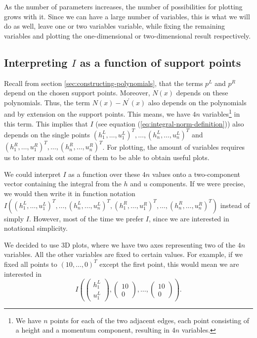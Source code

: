 \documentclass[a4paper, twoside]{article}
\begin{document}
As the number of parameters increases, the number of possibilities for plotting grows with it.
Since we can have a large number of variables, this is what we will do as well, leave one or two variables variable, while fixing the remaining variables and plotting the one-dimensional or two-dimensional result respectively.

\subsection{\texorpdfstring{Interpreting $I$ as a function of support points}{Interpreting I as a function of support points}}
\label{sec:some-considerations}

Recall from section \ref{sec:constructing-polynomials}, that the terms $p^L$ and $p^R$ depend on the chosen support points. Moreover, $N\left(x\right)$ depends on these polynomials. Thus, the term $N\left(x\right)-N^\prime\left(x\right)$ also depends on the polynomials and by extension on the support points. This means, we have $4n$ variables\footnote{We have $n$ points for each of the two adjacent edges, each point consisting of a height and a momentum component, resulting in $4n$ variables.} in this term.
This implies that $I$ (see equation (\ref{eq:integral-norm-definition})) also depends on the single points
$( h_1^L , \dots, u_1^L)^T ,\dots, ( h_n^L , \dots, u_n^L)^T$ and $( h_1^R , \dots, u_1^R)^T ,\dots,( h_n^R , \dots, u_n^R)^T $.
For plotting, the amount of variables requires us to later mask out some of them to be able to obtain useful plots.

We could interpret $I$ as a function over these $4n$ values onto a two-component vector containing the integral from the $h$ and $u$ components. If we were precise, we would then write it in function notation $
I\left(
  ( h_1^L , \dots, u_1^L)^T ,\dots,
( h_n^L , \dots, u_n^L)^T ,
( h_1^R , \dots, u_1^R)^T ,\dots,
( h_n^R , \dots, u_n^R)^T \right)$ instead of simply $I$. However, most of the time we prefer $I$, since we are interested in notational simplicity.

We decided to use 3D plots, where we have two axes representing two of the $4n$ variables. All the other variables are fixed to certain values.
For example, if we fixed all points to $( 10 , \dots, 0)^T$ except the first point, this would mean we are interested in
\begin{equation*}
  I\left(
    \begin{pmatrix}
      h_1^L \\ u_1^L
    \end{pmatrix},
    \begin{pmatrix}
      10 \\ 0
    \end{pmatrix}, \dots,
    \begin{pmatrix}
      10 \\ 0
    \end{pmatrix}
  \right).
\end{equation*}
\end{document}
